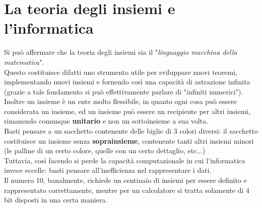 \documentclass[12pt]{article}
\begin{document}
\section{La teoria degli insiemi e l'informatica}
Si può affermare che la teoria degli insiemi sia il "\textit{linguaggio macchina della matematica}".\\
Questo costituisce difatti uno strumento utile per sviluppare nuovi teoremi, implementando nuovi insiemi e fornendo così una capacità di astrazione infinita (grazie a tale fondamento si può effettivamente parlare di "infiniti numerici").\\
Inoltre un insieme è un ente molto flessibile, in quanto ogni cosa può essere considerata un insieme, ed un insieme può essere un recipiente per altri insiemi, rimanendo comunque \textbf{unitario} e non un sottoinsieme a sua volta.\\
Basti pensare a un sacchetto contenente delle biglie di 3 colori diversi: il sacchetto costituisce un insieme senza \textbf{soprainsieme}, contenente tanti altri insiemi minori (le palline di un certo colore, quelle con un certo dettaglio, etc...)\\
Tuttavia, così facendo si perde la capacità computazionale in cui l'informatica invece eccelle: basti pensare all'inefficienza nel rappresentare i dati.\\
Il numero 10, banalmente, richiede un centinaio di insiemi per essere definito e rappresentato correttamente, mentre per un calcolatore si tratta solamente di 4 bit disposti in una certa maniera.
\end{document}
